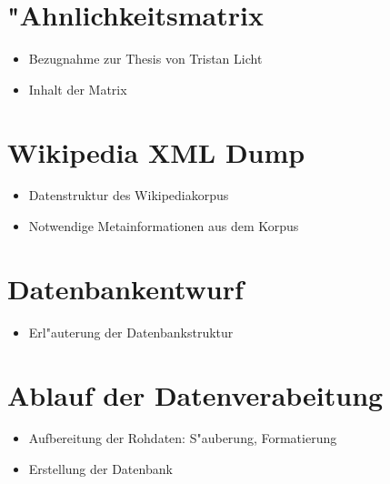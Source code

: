 
\section{"Ahnlichkeitsmatrix}
\begin{itemize}
    \item Bezugnahme zur Thesis von Tristan Licht
    \item Inhalt der Matrix
\end{itemize}

\section{Wikipedia XML Dump}
\begin{itemize}
    \item Datenstruktur des Wikipediakorpus
    \item Notwendige Metainformationen aus dem Korpus
\end{itemize}



\section{Datenbankentwurf}
\begin{itemize}
    \item Erl"auterung der Datenbankstruktur
\end{itemize}


\section{Ablauf der Datenverabeitung}
\begin{itemize}
    \item Aufbereitung der Rohdaten: S"auberung, Formatierung
    \item Erstellung der Datenbank
\end{itemize}
